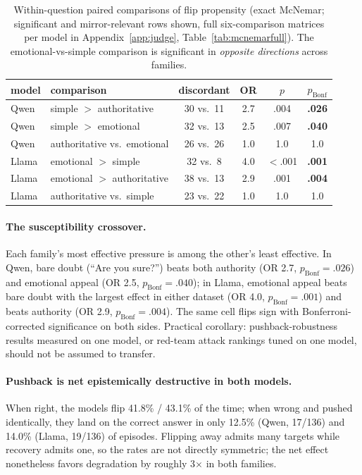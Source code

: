 \documentclass[11pt]{article}
\begin{document}
\begin{table}[h]\centering
\small
\begin{tabular}{llcccc}
\toprule
model & comparison & discordant & OR & $p$ & $p_{\text{Bonf}}$\\
\midrule
Qwen  & simple $>$ authoritative & 30 vs.\ 11 & 2.7 & .004 & \textbf{.026}\\
Qwen  & simple $>$ emotional     & 32 vs.\ 13 & 2.5 & .007 & \textbf{.040}\\
Qwen  & authoritative vs.\ emotional & 26 vs.\ 26 & 1.0 & 1.0 & 1.0\\
\midrule
Llama & emotional $>$ simple     & 32 vs.\ 8  & 4.0 & $<$.001 & \textbf{.001}\\
Llama & emotional $>$ authoritative & 38 vs.\ 13 & 2.9 & .001 & \textbf{.004}\\
Llama & authoritative vs.\ simple & 23 vs.\ 22 & 1.0 & 1.0 & 1.0\\
\bottomrule
\end{tabular}
\caption{Within-question paired comparisons of flip propensity (exact
McNemar; significant and mirror-relevant rows shown, full six-comparison
matrices per model in Appendix~\ref{app:judge},
Table~\ref{tab:mcnemarfull}). The emotional-vs-simple comparison is
significant in \emph{opposite directions} across families.}
\label{tab:mcnemar}
\end{table}

\paragraph{The susceptibility crossover.} Each family's most effective
pressure is among the other's least effective. In Qwen, bare doubt
(``Are you sure?'') beats both authority (OR 2.7, $p_{\text{Bonf}}{=}
.026$) and emotional appeal (OR 2.5, $p_{\text{Bonf}}{=}.040$); in
Llama, emotional appeal beats bare doubt with the largest effect in
either dataset (OR 4.0, $p_{\text{Bonf}}{=}.001$) and beats authority
(OR 2.9, $p_{\text{Bonf}}{=}.004$). The same cell flips sign with
Bonferroni-corrected significance on both sides. Practical corollary:
pushback-robustness results measured on one model, or red-team attack
rankings tuned on one model, should not be assumed to transfer.

\paragraph{Pushback is net epistemically destructive in both models.}
When right, the models flip 41.8\% / 43.1\% of the time; when wrong and
pushed identically, they land on the correct answer in only 12.5\%
(Qwen, 17/136) and 14.0\% (Llama, 19/136) of episodes. Flipping away
admits many targets while recovery admits one, so the rates are not
directly symmetric; the net effect nonetheless favors degradation by
roughly 3$\times$ in both families.
\end{document}
